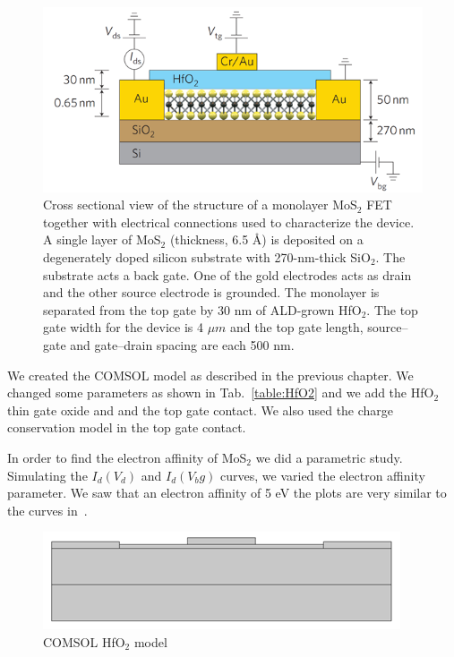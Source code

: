 \documentclass[12pt,a4paper,titlepage]{article}
\begin{document}
\begin{figure}[H]
	\centering
	\includegraphics[width=1\textwidth]{Immagini/HfO2_model.png} 
	\caption{Cross sectional view of the structure of a monolayer MoS$_2$ FET together with electrical connections used to characterize the device. A single layer of MoS$_2$ (thickness, 6.5 \AA) is deposited on a degenerately doped silicon substrate with 270-nm-thick SiO$_2$. The substrate acts a back gate. One of the gold electrodes acts as drain and the other source electrode is grounded. The monolayer is separated from the top gate by 30 nm of ALD-grown HfO$_2$. The top gate width for the device is 4 $\mu m$ and the top gate length, source–gate and gate–drain spacing are each 500 nm.~\cite{Radisavljevic:Si_MoS2}}
	\label{fig:HfO2_model}
\end{figure} 

We created the COMSOL model as described in the previous chapter. We changed some parameters as shown in Tab.~\ref{table:HfO2} and we add the HfO$_2$ thin gate oxide and and the top gate contact. We also used the charge conservation model in the top gate contact. 

In order to find the electron affinity of MoS$_2$ we did a parametric study. Simulating the $I_d(V_d)$ and $I_d(V_bg)$ curves, we varied the electron affinity parameter. We saw that an electron affinity of 5 eV the plots are very similar to the curves in~\cite{Radisavljevic:Si_MoS2}.

\begin{figure}[H]
	\centering
	\includegraphics[width=.8\textwidth]{Immagini/HfO2_model_comsol.png} 
	\caption{COMSOL HfO$_2$ model}
	\label{fig:HfO2_model_comsol}
\end{figure} 
	
\end{document}
